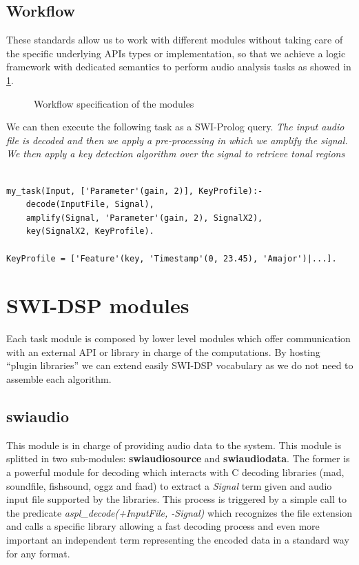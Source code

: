 \documentclass[runningheads]{llncs}
\begin{document}
\subsection{Workflow}\label{subsec:worflow}

These standards allow us to work with different modules without taking care of the specific underlying APIs types or implementation, so that we achieve a logic framework with dedicated semantics to perform audio analysis tasks as showed in \ref{fig:workflow}.

\begin{figure}
\centerline{}
\caption{Workflow specification of the modules}
\label{fig:workflow}
\end{figure}

We can then execute the following task as a SWI-Prolog query. \textit{The input audio file is decoded and then we apply a pre-processing in which we amplify the signal. We then apply a key detection algorithm over the signal to retrieve tonal regions}

\begin{verbatim}
 
my_task(Input, ['Parameter'(gain, 2)], KeyProfile):-
	decode(InputFile, Signal),
	amplify(Signal, 'Parameter'(gain, 2), SignalX2),
	key(SignalX2, KeyProfile).

KeyProfile = ['Feature'(key, 'Timestamp'(0, 23.45), 'Amajor')|...].	

\end{verbatim}

\section{SWI-DSP modules}\label{sec:modules}

Each task module is composed by lower level modules which offer communication with an external API or library in charge of the computations. By hosting ``plugin libraries'' we can extend easily SWI-DSP vocabulary as we do not need to assemble each algorithm.

\subsection{swiaudio}\label{subsec:swiaudio}

This module is in charge of providing audio data to the system. This module is splitted in two sub-modules: \textbf{swiaudiosource} and \textbf{swiaudiodata}. The former is a powerful module for decoding which interacts with C decoding libraries (mad, soundfile, fishsound, oggz and faad) to extract a \textit{Signal} term given and audio input file supported by the libraries. This process is triggered by a simple call to the predicate \textit{aspl\_decode(+InputFile, -Signal)} which recognizes the file extension and calls a specific library allowing a fast decoding process and even more important an independent term representing the encoded data in a standard way for any format.
\end{document}
